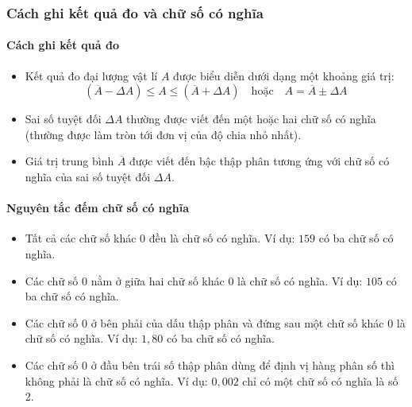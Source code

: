 \subsubsection{Cách ghi kết quả đo và chữ số có nghĩa}
\paragraph{Cách ghi kết quả đo}
\begin{itemize}
\item Kết quả đo đại lượng vật lí $A$ được biểu diễn dưới dạng một khoảng giá trị:
\[
(\overline{A} - \Delta A) \le A \le (\overline{A} + \Delta A) \quad \text{hoặc} \quad A = \overline{A} \pm \Delta A
\]
\item Sai số tuyệt đối $\Delta A$ thường được viết đến một hoặc hai chữ số có nghĩa (thường được làm tròn tới đơn vị của độ chia nhỏ nhất).
\item Giá trị trung bình $\overline{A}$ được viết đến bậc thập phân tương ứng với chữ số có nghĩa của sai số tuyệt đối $\Delta A$.
\end{itemize}
\paragraph{Nguyên tắc đếm chữ số có nghĩa}
\begin{itemize}
\item Tất cả các chữ số khác 0 đều là chữ số có nghĩa. Ví dụ: $159$ có ba chữ số có nghĩa.
\item Các chữ số 0 nằm ở giữa hai chữ số khác 0 là chữ số có nghĩa. Ví dụ: $105$ có ba chữ số có nghĩa.
\item Các chữ số 0 ở bên phải của dấu thập phân và đứng sau một chữ số khác 0 là chữ số có nghĩa. Ví dụ: $1,80$ có ba chữ số có nghĩa.
\item Các chữ số 0 ở đầu bên trái số thập phân dùng để định vị hàng phân số thì không phải là chữ số có nghĩa. Ví dụ: $0,002$ chỉ có một chữ số có nghĩa là số 2.
\end{itemize}
